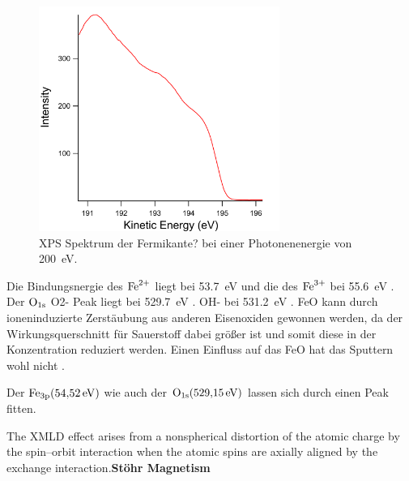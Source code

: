             \begin{figure}
                \centering
                \includegraphics[width=0.7\textwidth]{./content/pictures/FeO/Fermi.png}
                \caption{XPS Spektrum der Fermikante? bei einer Photonenenergie von \SI{200}{\electronvolt}.}
                \label{fig:XPSFermi}
            \end{figure}

            Die Bindungsnergie des $\ce{Fe}^{2+}$ liegt bei \SI{53.7}{\electronvolt} und die des $\ce{Fe}^{3+}$ bei \SI{55.6}{\electronvolt} \cite{FeO_7}.
            Der  $\ce{O}_{1\text{s}}$ O2- Peak liegt bei \SI{529.7}{\electronvolt} \cite{FeO_9}.
            OH- bei \SI{531.2}{\electronvolt} \cite{FeO_9}.
            FeO kann durch ioneninduzierte Zerstäubung aus anderen Eisenoxiden gewonnen werden, da der Wirkungsquerschnitt für Sauerstoff dabei größer ist und somit diese in der Konzentration reduziert werden. \cite{FeO_12}
            Einen Einfluss auf das FeO hat das Sputtern wohl nicht \cite{FeO_12}.

            Der $\ce{Fe}_{3\text{p}} (\SI{54.52}{\electronvolt})$ wie auch der $\ce{O}_{1\text{s}} (\SI{529.15}{\electronvolt})$ lassen sich durch einen Peak fitten.

            The XMLD effect arises from a nonspherical distortion of the atomic charge by the spin–orbit interaction when the atomic spins are axially aligned by the exchange interaction.\textbf{Stöhr Magnetism}


